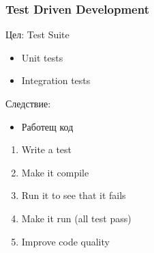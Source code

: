 \begin{frame}
  \frametitle{Test Driven Development}
    \begin{minipage}[t]{0.48\linewidth}
        Цел: Test Suite
        \begin{itemize}
            \item Unit tests
            \item Integration tests
        \end{itemize}
        Следствие:
        \begin{itemize}
            \item Работещ код
        \end{itemize}
    \end{minipage}\hfill
    \begin{minipage}[t]{0.48\linewidth}
        \begin{enumerate} 
            \item Write a test
            \item Make it compile
            \item Run it to see that it fails
            \item Make it run (all test pass)
            \item Improve code quality
         \end{enumerate} 
    \end{minipage}
\end{frame}


